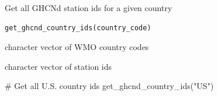 %
\begin{Description}
Get all GHCNd station ids for a given country
\end{Description}
%
\begin{Usage}
\begin{verbatim}
get_ghcnd_country_ids(country_code)
\end{verbatim}
\end{Usage}
%
\begin{Arguments}
\begin{ldescription}
\item[\code{country\_code}] character vector of WMO country codes
\end{ldescription}
\end{Arguments}
%
\begin{Value}
character vector of station ids
\end{Value}
%
\begin{Examples}
\begin{ExampleCode}
# Get all U.S. country ids
get_ghcnd_country_ids("US")
\end{ExampleCode}
\end{Examples}
